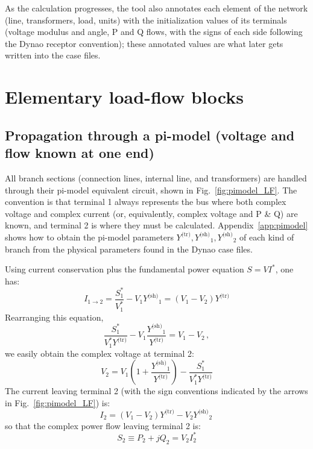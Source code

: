 \documentclass[a4paper,11pt]{article}
\newcommand{\Dynawo}{Dyna\textomega o} %
\newcommand{\Ytr}{\ensuremath{Y^{\textrm{(tr)}}}}
\newcommand{\Ysh}{\ensuremath{Y^{\textrm{(sh)}}}}
\begin{document}
As the calculation progresses, the tool also annotates each element of the network
(line, transformers, load, units) with the initialization values of its terminals
(voltage modulus and angle, P and Q flows, with the signs of each side following the
\Dynawo{} receptor convention); these annotated values are what later gets written into
the case files.




\section{Elementary load-flow blocks}
\label{sec:blocks}

\subsection{Propagation through a pi-model (voltage and flow known at one end)}
\label{sec:pimodel_lf}

All branch sections (connection lines, internal line, and transformers) are handled
through their pi-model equivalent circuit, shown in Fig.~\ref{fig:pimodel_LF}. The
convention is that terminal 1 always represents the bus where both complex voltage and
complex current (or, equivalently, complex voltage and P \& Q) are known, and terminal 2
is where they must be calculated. Appendix~\ref{app:pimodel} shows how to obtain the
pi-model parameters $\Ytr, \Ysh_1, \Ysh_2$ of each kind of branch from the physical
parameters found in the \Dynawo{} case files.

Using current conservation plus the fundamental power equation $S=VI^*$, one has:
\begin{equation*}
  I_{1\rightarrow 2} = \frac{S_1^*}{V_1^*} - V_1 \Ysh_1
                     = ( V_1 - V_2 ) \Ytr
\end{equation*}
Rearranging this equation,
\begin{equation*}
  \frac{S_1^*}{V_1^* \Ytr} - V_1 \frac{\Ysh_1}{\Ytr}
  = V_1 - V_2 \,,
\end{equation*}
we easily obtain the complex voltage at terminal 2:
\begin{equation}
  V_2 = V_1 \left(1 + \frac{\Ysh_1}{\Ytr} \right) - \frac{S_1^*}{V_1^* \Ytr}
  \label{eq:complex_V}
\end{equation}
The current leaving terminal 2 (with the sign conventions indicated by the arrows in
Fig.~\ref{fig:pimodel_LF}) is:
\begin{equation}
  I_2 = ( V_1 - V_2 ) \Ytr - V_2 \Ysh_2 \,
  \label{eq:complex_I}
\end{equation}
so that the complex power flow leaving terminal 2 is:
\begin{equation}
  S_2 \equiv P_2 + j Q_2 = V_2 I_2^*
  \label{eq:complex_S}
\end{equation}
\end{document}

